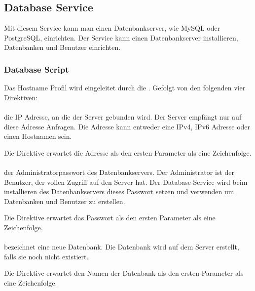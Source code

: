\subsection{Database Service}

Mit diesem Service kann man einen Datenbankserver, wie MySQL oder PostgreSQL,
einrichten. Der Service kann einen Datenbankserver installieren, Datenbanken
und Benutzer einrichten.

\subsubsection{Database Script}

Das Hostname Profil wird eingeleitet durch die . Gefolgt von
den folgenden vier Direktiven:

\paragraph{}

die IP Adresse, an die der Server gebunden wird. Der Server empfängt nur auf diese
Adresse Anfragen. Die Adresse kann entweder eine IPv4, IPv6 Adresse oder
einen Hostnamen sein.

Die Direktive erwartet die Adresse als den ersten Parameter als eine Zeichenfolge.

\paragraph{}

der Administratorpasswort des Datenbankservers. Der Administrator ist der Benutzer,
der vollen Zugriff auf den Server hat. Der Database-Service wird beim installieren
des Datenbankservers dieses Passwort setzen und verwenden um Datenbanken und Benutzer
zu erstellen.

Die Direktive erwartet das Passwort als den ersten Parameter als eine Zeichenfolge.

\paragraph{}

bezeichnet eine neue Datenbank. Die Datenbank wird auf dem Server erstellt, falls
sie noch nicht existiert.

Die Direktive erwartet den Namen der Datenbank als den ersten Parameter als eine Zeichenfolge.

